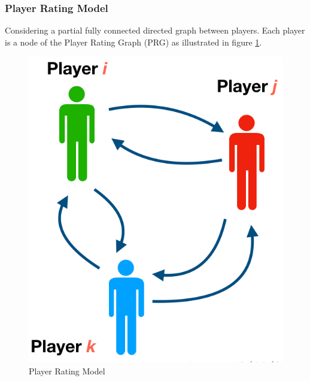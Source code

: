 

\subsubsection{Player Rating Model}




Considering a partial fully connected directed graph between players. 
Each player is a node of the Player Rating Graph (PRG) as illustrated in figure \ref{fig:graph}.

\begin{figure}[htp]
\centering
\includegraphics[width=0.3\columnwidth]{figures/graph}
\caption{Player Rating Model}
\label{fig:graph}
\end{figure}


